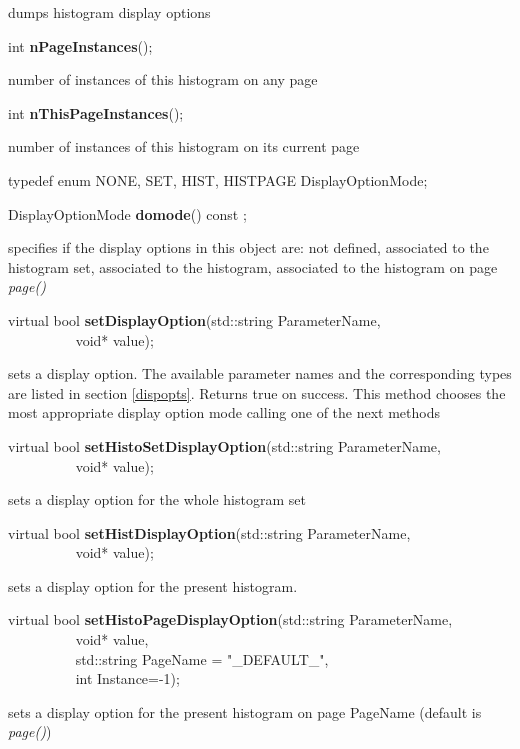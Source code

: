  dumps histogram display options


\item    int {\bf nPageInstances}();


 number of instances of this histogram on any page


\item    int {\bf nThisPageInstances}();


 number of instances of this histogram on its current page


\item   typedef enum { NONE, SET, HIST, HISTPAGE } DisplayOptionMode;
\item    DisplayOptionMode {\bf domode}() const ;

 specifies if the display options in this object are: not defined,
 associated to the histogram set, associated to the histogram,
 associated to the histogram on  page {\it page()}


\item    virtual bool {\bf setDisplayOption}(std::string ParameterName,\\\mbox{}~~~~~~~~~ 
				void* value);

 sets a display option.  The available parameter names and the corresponding types are listed 
 in section \ref{dispopts}. Returns true on success.
 This method chooses the most appropriate display option mode calling one of the next methods  


\item    virtual bool {\bf setHistoSetDisplayOption}(std::string ParameterName,\\\mbox{}~~~~~~~~~ 
					void* value);

 sets a display option for the whole histogram set


\item    virtual bool {\bf setHistDisplayOption}(std::string ParameterName,\\\mbox{}~~~~~~~~~ 
				void* value);

 sets a display option for the present histogram.


\item    virtual bool {\bf setHistoPageDisplayOption}(std::string ParameterName,\\\mbox{}~~~~~~~~~ 
					 void* value,\\\mbox{}~~~~~~~~~
					 std::string PageName = "\_DEFAULT\_",\\\mbox{}~~~~~~~~~
					 int Instance=-1);

 sets a display option for the present histogram on page PageName (default is {\it page()})


